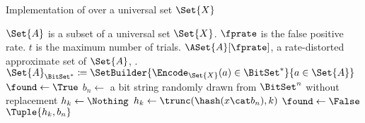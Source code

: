 \documentclass[ ../main.tex]{subfiles}
\begin{document}
%
%
%
%
\begin{algorithm}
	\caption{Implementation of \protect\MakeSingularHashMap over a universal set $\Set{X}$}
	\label{alg:makeset}
	\DontPrintSemicolon
	\KwIn
	{
		$\Set{A}$ is a subset of a universal set $\Set{X}$.
		$\fprate$ is the false positive rate.
		$t$ is the maximum number of trials.
	}
	\KwOut
	{
		$\ASet{A}[\fprate]$, a rate-distorted approximate set of $\Set{A}$, .
	}
	{
		$\Set{A}_{\BitSet^*} \coloneqq \SetBuilder{\Encode_{\Set{X}}(a) \in \BitSet^*}{a \in \Set{A}}$\;
		{
			{
				$\found \gets \True$\;
				$b_n \gets $ a bit string randomly drawn from $\BitSet^n$ without replacement\;
				$h_k \gets \Nothing$\;
				{
					{
						$h_k \gets \trunc(\hash(x \cat b_n), k)$\;
					}
					{
						$\found \gets \False$\;
					}
				}
				\If{\found}
				{
					\Return $\Tuple{h_k, b_n}$\;
				}
			}
		}
	}
\end{algorithm}
\end{document}

